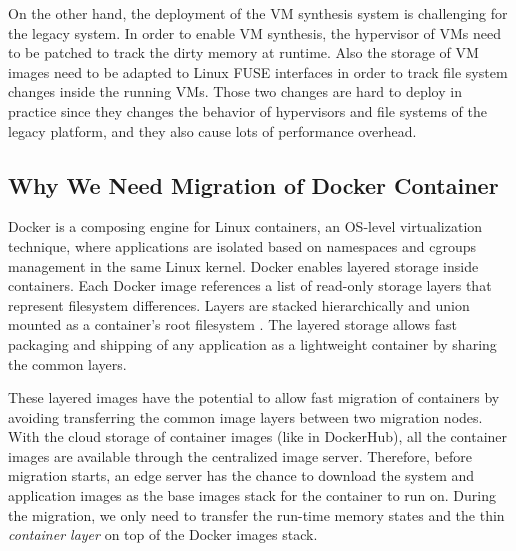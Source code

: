 On the other hand, the deployment of the VM synthesis system is challenging for the legacy system. In order to enable VM synthesis, the hypervisor of VMs need to be patched to track the dirty memory at runtime. Also the storage of VM images need to be adapted to Linux FUSE interfaces in order to track file system changes inside the running VMs. Those two changes are hard to deploy in practice since they changes the behavior of hypervisors and file systems of the legacy platform, and they also cause lots of performance overhead. 

\subsection{Why We Need Migration of Docker Container}
Docker 
is a composing engine for Linux containers, an OS-level virtualization technique, where applications are isolated based on namespaces and cgroups management in the same Linux kernel. Docker enables layered storage inside containers.  Each Docker image references a list of read-only storage layers that represent filesystem differences. Layers are stacked hierarchically and union mounted as a container's root filesystem \cite{dockerlayer}. The layered storage allows fast packaging and shipping of any application as a lightweight container by sharing the common layers.

These layered images have the potential to allow fast migration of containers by avoiding transferring the common image layers between two migration nodes. With the cloud storage of container images (like in DockerHub), all the container images are available through the centralized image server. Therefore, before migration starts, an edge server has the chance to download the system and application images as the base images stack for the container to run on. 
During the migration, we only need to transfer the run-time memory states and the thin \textit{container layer} on top of the Docker images stack. 

